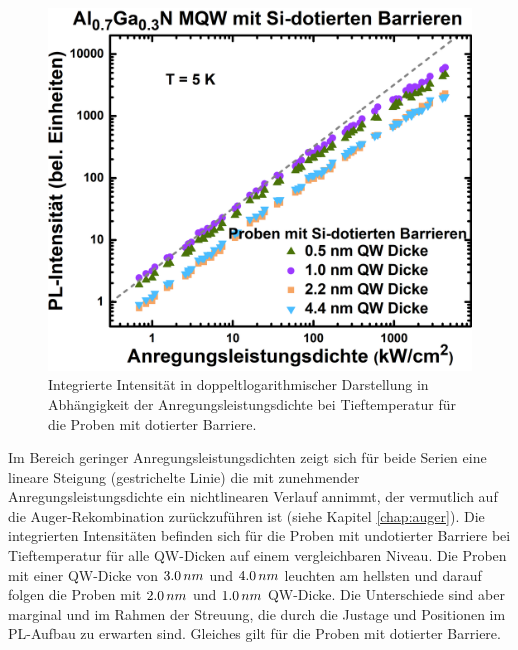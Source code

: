 \begin{figure}[H]
\begin{minipage}[t]{0.49\textwidth}
    \includegraphics[width=\linewidth]{Bilder/MQWdickenSerie/intTTdotierte.png}
		\caption{Integrierte Intensität in doppeltlogarithmischer Darstellung in Abhängigkeit der Anregungsleistungsdichte bei Tieftemperatur für die Proben mit dotierter Barriere.}
    \label{fig:dotiertint}
  \end{minipage}
\end{figure}
\noindent 
Im Bereich geringer Anregungsleistungsdichten zeigt sich für beide Serien eine lineare Steigung (gestrichelte Linie) die mit zunehmender Anregungsleistungsdichte ein nichtlinearen Verlauf annimmt, der vermutlich auf die Auger-Rekombination zurückzuführen ist (siehe Kapitel \ref{chap:auger}).
Die integrierten Intensitäten befinden sich für die Proben mit undotierter Barriere bei Tieftemperatur für alle QW-Dicken auf einem vergleichbaren Niveau.
\newline
Die Proben mit einer QW-Dicke von $3.0 \thinspace nm$ und $4.0 \thinspace nm$ leuchten am hellsten und darauf folgen die Proben mit $2.0 \thinspace nm$ und $1.0 \thinspace nm$  QW-Dicke. Die Unterschiede sind aber marginal und im Rahmen der Streuung, die durch die Justage und Positionen im PL-Aufbau zu erwarten sind. Gleiches gilt für die Proben mit dotierter Barriere. 
